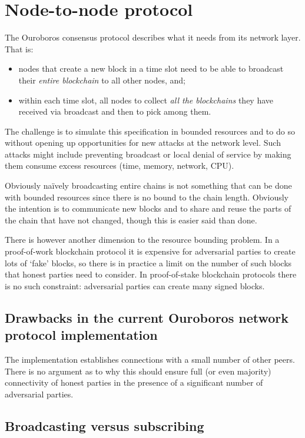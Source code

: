 \documentclass{article}
\theoremstyle{definition}{
  \newtheorem{lemma}{Lemma}[section] %
  \newtheorem{definition}[lemma]{Definition}
}
\theoremstyle{theorem}{
  \newtheorem{invariant}[lemma]{Invariant}
  \newtheorem{proofobligation}[lemma]{Proof Obligation}
}
\numberwithin{equation}{lemma}
\begin{document}
\section{Node-to-node protocol}

The Ouroboros consensus protocol \citep{ouroboros-classic} describes what it
needs from its network layer. That is:
\begin{itemize}
\item nodes that create a new block in a time slot need to be able to broadcast
      their \emph{entire blockchain} to all other nodes, and;
\item within each time slot, all nodes to collect \emph{all the blockchains}
      they have received via broadcast and then to pick among them.
\end{itemize}

The challenge is to simulate this specification in bounded resources and to do
so without opening up opportunities for new attacks at the network level. Such
attacks might include preventing broadcast or local denial of service by making
them consume excess resources (time, memory, network, CPU).

Obviously na\"ively broadcasting entire chains is not something that can be
done with bounded resources since there is no bound to the chain length.
Obviously the intention is to communicate new blocks and to share and reuse the
parts of the chain that have not changed, though this is easier said than done.

There is however another dimension to the resource bounding problem. In a
proof-of-work blockchain protocol it is expensive for adversarial parties to
create lots of `fake' blocks, so there is in practice a limit on the number of
such blocks that honest parties need to consider. In proof-of-stake blockchain
protocols there is no such constraint: adversarial parties can create many
signed blocks.

\subsection{Drawbacks in the current Ouroboros network protocol implementation}

The implementation establishes connections with a small number of other peers.
There is no argument as to why this should ensure full (or even majority)
connectivity of honest parties in the presence of a significant number of
adversarial parties.

\subsection{Broadcasting versus subscribing}
\end{document}

